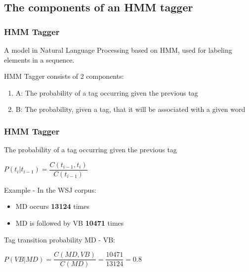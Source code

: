 \documentclass[13.5pt,aspecratio=169]{beamer}
\begin{document}
\subsection{The components of an HMM tagger}
\begin{frame}
    \onehalfspacing
        \frametitle{HMM Tagger}
        \begin{block}{}
            A model in Natural Language Processing based on HMM, used for labeling elements in a sequence.
        \end{block}
        HMM Tagger consists of 2 components:
        \begin{enumerate}
            \item A: The probability of a tag occurring given the previous tag
            \item B: The probability, given a tag, that it will be associated with a given word
        \end{enumerate}
    \end{frame}
\begin{frame}
\onehalfspacing
	\frametitle{HMM Tagger}
    {\Large The probability of a tag occurring given the previous tag
    \begin{center}
        $P(t_i | t_{i-1}) = \dfrac{C(t_{i-1}, t_i)}{C(t_{i-1})}$
    \end{center}}

    {
        \begin{block}{Example - In the WSJ corpus:}
            \begin{itemize}
                \item MD occurs \textbf{13124} times
                \item MD is followed
                by VB \textbf{10471} times
            \end{itemize}
            Tag transition probability MD - VB:
            \begin{center}
                $ P(VB | MD) = \dfrac{C(MD, VB)}{C(MD)} = \dfrac{10471}{13124} = 0.8 $
            \end{center}
        \end{block}
    }
\end{frame}
\end{document}
